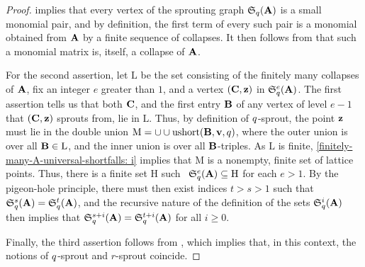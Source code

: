 \documentclass{article}
\begin{document}
\begin{proof}   implies that every vertex of the sprouting graph $\mathfrak{S}_q(\mathbf{A})$ is a small monomial pair, and by definition, the first term of every such pair is a monomial obtained from $\mathbf{A}$ by a finite sequence of collapses.  It then follows from  that such a monomial matrix is, itself, a collapse of $\mathbf{A}$.

For the second assertion, let $\mathrm{L}$ be the set consisting of the finitely many collapses of $\mathbf{A}$, fix an integer $e$ greater than $1$, and a vertex $(\mathbf{C}, \mathbf{z})$ in $\mathfrak{S}_{q}^e(\mathbf{A})$.  The first assertion tells us that both $\mathbf{C}$, and the first entry $\mathbf{B}$ of any vertex of level $e-1$ that $(\mathbf{C}, \mathbf{z})$ sprouts from, lie in $\mathrm{L}$.  Thus, by definition of $q$-sprout, the point $\mathbf{z}$ must lie in the double union $\mathrm{M} = \cup \cup \operatorname{ushort}(\mathbf{B}, \mathbf{v}, q)$, where the outer union is over all $\mathbf{B} \in \mathrm{L}$, and the inner union is over all $\mathbf{B}$-triples.    As $\mathrm{L}$ is finite, \ref{finitely-many-A-universal-shortfalls: i}  implies that $\mathrm{M}$ is a nonempty, finite set of lattice points.   Thus, there is a finite set $\mathrm{H}$ such \ $\mathfrak{S}_{q}^e(\mathbf{A}) \subseteq \mathrm{H}$ for each $e>1$.  By the pigeon-hole principle, there must then exist indices $t > s > 1$ such that $\mathfrak{S}_{q}^s(\mathbf{A}) = \mathfrak{S}_{q}^t(\mathbf{A})$, and the recursive nature of the definition of the sets $\mathfrak{S}_{q}^i(\mathbf{A})$ then implies that $\mathfrak{S}_{q}^{s+i}(\mathbf{A}) = \mathfrak{S}_{q}^{t+i}(\mathbf{A})$ for all $i \geq 0$.

Finally, the third assertion follows from , {which implies that, in this context, the notions of $q$-sprout and $r$-sprout coincide.}
\end{proof}
\end{document}
